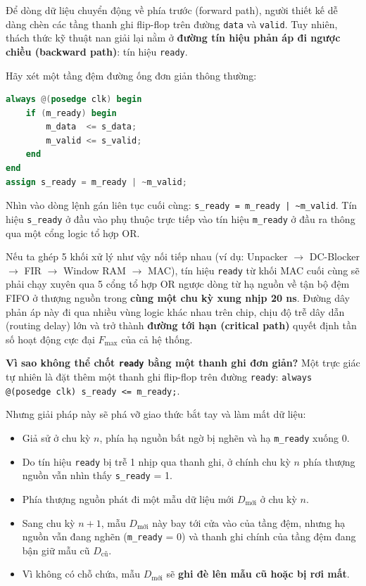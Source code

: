 Để dòng dữ liệu chuyển động về phía trước (forward path), người thiết kế dễ dàng chèn các tầng thanh ghi flip-flop trên đường \texttt{data} và \texttt{valid}. Tuy nhiên, thách thức kỹ thuật nan giải lại nằm ở \textbf{đường tín hiệu phản áp đi ngược chiều (backward path)}: tín hiệu \texttt{ready}.

Hãy xét một tầng đệm đường ống đơn giản thông thường:
\begin{lstlisting}[language=Verilog, caption={Tầng chốt đường ống đơn giản với đường ready tổ hợp thuần}]
always @(posedge clk) begin
    if (m_ready) begin
        m_data  <= s_data;
        m_valid <= s_valid;
    end
end
assign s_ready = m_ready | ~m_valid;
\end{lstlisting}

Nhìn vào dòng lệnh gán liên tục cuối cùng: \texttt{s\_ready = m\_ready | \~{}m\_valid}. Tín hiệu \texttt{s\_ready} ở đầu vào phụ thuộc trực tiếp vào tín hiệu \texttt{m\_ready} ở đầu ra thông qua một cổng logic tổ hợp OR. 

Nếu ta ghép 5 khối xử lý như vậy nối tiếp nhau (ví dụ: Unpacker $\to$ DC-Blocker $\to$ FIR $\to$ Window RAM $\to$ MAC), tín hiệu \texttt{ready} từ khối MAC cuối cùng sẽ phải chạy xuyên qua 5 cổng tổ hợp OR ngược dòng từ hạ nguồn về tận bộ đệm FIFO ở thượng nguồn trong \textbf{cùng một chu kỳ xung nhịp 20 ns}. Đường dây phản áp này đi qua nhiều vùng logic khác nhau trên chip, chịu độ trễ dây dẫn (routing delay) lớn và trở thành \textbf{đường tới hạn (critical path)} quyết định tần số hoạt động cực đại $F_{\max}$ của cả hệ thống.

\textbf{Vì sao không thể chốt \texttt{ready} bằng một thanh ghi đơn giản?}
Một trực giác tự nhiên là đặt thêm một thanh ghi flip-flop trên đường \texttt{ready}: \texttt{always @(posedge clk) s\_ready <= m\_ready;}. 

Nhưng giải pháp này sẽ phá vỡ giao thức bắt tay và làm mất dữ liệu:
\begin{itemize}[leftmargin=1.5em, itemsep=2pt]
    \item Giả sử ở chu kỳ $n$, phía hạ nguồn bất ngờ bị nghẽn và hạ \texttt{m\_ready} xuống 0.
    \item Do tín hiệu \texttt{ready} bị trễ 1 nhịp qua thanh ghi, ở chính chu kỳ $n$ phía thượng nguồn vẫn nhìn thấy \texttt{s\_ready} = 1.
    \item Phía thượng nguồn phát đi một mẫu dữ liệu mới $D_{\text{mới}}$ ở chu kỳ $n$.
    \item Sang chu kỳ $n+1$, mẫu $D_{\text{mới}}$ này bay tới cửa vào của tầng đệm, nhưng hạ nguồn vẫn đang nghẽn (\texttt{m\_ready} = 0) và thanh ghi chính của tầng đệm đang bận giữ mẫu cũ $D_{\text{cũ}}$. 
    \item Vì không có chỗ chứa, mẫu $D_{\text{mới}}$ sẽ \textbf{ghi đè lên mẫu cũ hoặc bị rơi mất}.
\end{itemize}

